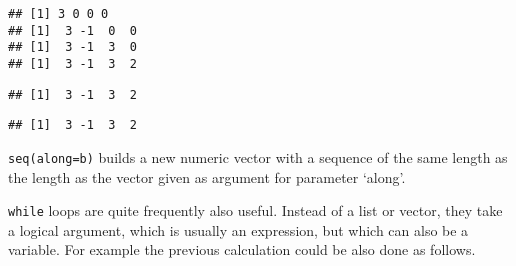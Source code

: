 \documentclass[paper=a4,headsepline,BCOR=12mm,twoside,open=right,%
titlepage,headings=small,fontsize=10pt,index=totoc,bibliography=totoc,%
captions=tableheading,captions=nooneline]{scrbook}\usepackage{knitr}
\begin{document}
\begin{knitrout}\footnotesize
{}\color{fgcolor}\begin{kframe}
\begin{alltt}
 \hlkwb{<-} \hlstd{(}\hlopt{-}\hlstd{)}
  \hlstd{(}
   \hlkwb{<-} \hlstd{a[i}\hlopt{+}\hlstd{]} \hlopt{-} 
\hlstd{\}}
\end{alltt}
\begin{verbatim}
## [1] 3 0 0 0
## [1]  3 -1  0  0
## [1]  3 -1  3  0
## [1]  3 -1  3  2
\end{verbatim}
\begin{alltt}
 \hlkwb{<-} \hlstd{a[}\hlopt{:}\hlstd{(a)]} \hlopt{-} \hlstd{a[}\hlopt{:}\hlopt{-}\hlstd{]}
\end{alltt}
\begin{verbatim}
## [1]  3 -1  3  2
\end{verbatim}
\begin{alltt}
 \hlkwb{<-} 
\end{alltt}
\begin{verbatim}
## [1]  3 -1  3  2
\end{verbatim}
\end{kframe}
\end{knitrout}

\texttt{seq(along=b)} builds a new numeric vector with a sequence of the same length as the length as the vector given as argument for parameter `along'.

\texttt{while} loops are quite frequently also useful. Instead of a list or vector, they take a logical argument, which is usually an expression, but which can also be a variable. For example the previous calculation could be also done as follows.
\end{document}

